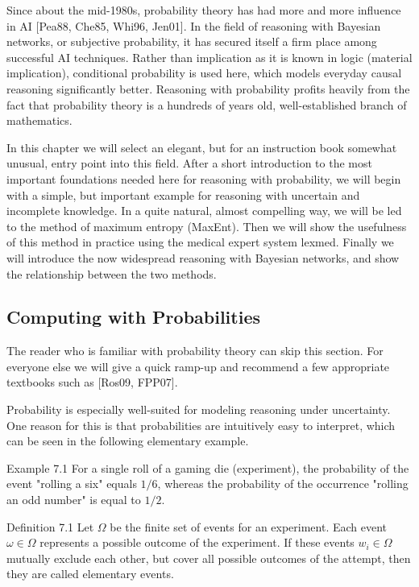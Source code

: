 \documentclass[10pt]{article}
\begin{document}
Since about the mid-1980s, probability theory has had more and more influence in AI [Pea88, Che85, Whi96, Jen01]. In the field of reasoning with Bayesian networks, or subjective probability, it has secured itself a firm place among successful AI techniques. Rather than implication as it is known in logic (material implication), conditional probability is used here, which models everyday causal reasoning significantly better. Reasoning with probability profits heavily from the fact that probability theory is a hundreds of years old, well-established branch of mathematics.

In this chapter we will select an elegant, but for an instruction book somewhat unusual, entry point into this field. After a short introduction to the most important foundations needed here for reasoning with probability, we will begin with a simple, but important example for reasoning with uncertain and incomplete knowledge. In a quite natural, almost compelling way, we will be led to the method of maximum entropy (MaxEnt). Then we will show the usefulness of this method in practice using the medical expert system lexmed. Finally we will introduce the now widespread reasoning with Bayesian networks, and show the relationship between the two methods.

\subsection*{Computing with Probabilities}
The reader who is familiar with probability theory can skip this section. For everyone else we will give a quick ramp-up and recommend a few appropriate textbooks such as [Ros09, FPP07].

Probability is especially well-suited for modeling reasoning under uncertainty. One reason for this is that probabilities are intuitively easy to interpret, which can be seen in the following elementary example.

Example 7.1 For a single roll of a gaming die (experiment), the probability of the event "rolling a six" equals $1 / 6$, whereas the probability of the occurrence "rolling an odd number" is equal to $1 / 2$.

Definition 7.1 Let $\Omega$ be the finite set of events for an experiment. Each event $\omega \in \Omega$ represents a possible outcome of the experiment. If these events $w_{i} \in \Omega$ mutually exclude each other, but cover all possible outcomes of the attempt, then they are called elementary events.
\end{document}
